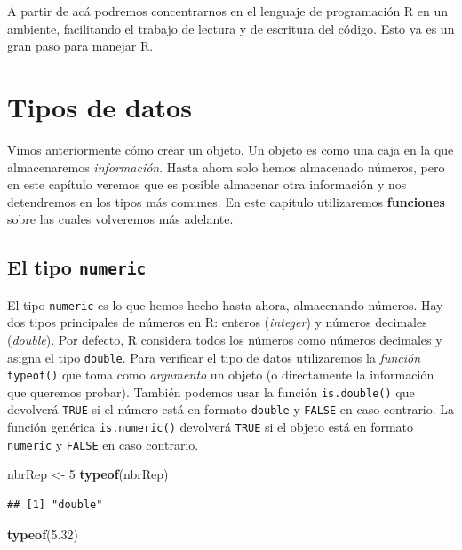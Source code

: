 \documentclass[]{book}
\newenvironment{Shaded}{\begin{snugshade}}{\end{snugshade}}
\newcommand{\KeywordTok}[1]{\textcolor[rgb]{0.13,0.29,0.53}{\textbf{#1}}}
\newcommand{\DecValTok}[1]{\textcolor[rgb]{0.00,0.00,0.81}{#1}}
\newcommand{\FloatTok}[1]{\textcolor[rgb]{0.00,0.00,0.81}{#1}}
\newcommand{\StringTok}[1]{\textcolor[rgb]{0.31,0.60,0.02}{#1}}
\newcommand{\NormalTok}[1]{#1}
\begin{document}
A partir de acá podremos concentrarnos en el lenguaje de programación R
en un ambiente, facilitando el trabajo de lectura y de escritura del
código. Esto ya es un gran paso para manejar R.

\chapter{Tipos de datos}\label{dataType1}

Vimos anteriormente cómo crear un objeto. Un objeto es como una caja en
la que almacenaremos \emph{información}. Hasta ahora solo hemos
almacenado números, pero en este capítulo veremos que es posible
almacenar otra información y nos detendremos en los tipos más comunes.
En este capítulo utilizaremos \textbf{funciones} sobre las cuales
volveremos más adelante.

\section{\texorpdfstring{El tipo
\texttt{numeric}}{El tipo numeric}}\label{el-tipo-numeric}

El tipo \texttt{numeric} es lo que hemos hecho hasta ahora, almacenando
números. Hay dos tipos principales de números en R: enteros
(\emph{integer}) y números decimales (\emph{double}). Por defecto, R
considera todos los números como números decimales y asigna el tipo
\texttt{double}. Para verificar el tipo de datos utilizaremos la
\emph{función} \texttt{typeof()} que toma como \emph{argumento} un
objeto (o directamente la información que queremos probar). También
podemos usar la función \texttt{is.double()} que devolverá \texttt{TRUE}
si el número está en formato \texttt{double} y \texttt{FALSE} en caso
contrario. La función genérica \texttt{is.numeric()} devolverá
\texttt{TRUE} si el objeto está en formato \texttt{numeric} y
\texttt{FALSE} en caso contrario.

\begin{Shaded}
\begin{Highlighting}[]
\NormalTok{nbrRep <-}\StringTok{ }\DecValTok{5}
\KeywordTok{typeof}\NormalTok{(nbrRep)}
\end{Highlighting}
\end{Shaded}

\begin{verbatim}
## [1] "double"
\end{verbatim}

\begin{Shaded}
\begin{Highlighting}[]
\KeywordTok{typeof}\NormalTok{(}\FloatTok{5.32}\NormalTok{)}
\end{Highlighting}
\end{Shaded}
\end{document}
